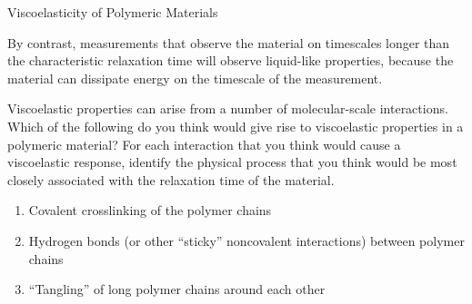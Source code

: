 \begin{activity}{Viscoelasticity of Polymeric Materials}
\begin{ctqs}
\begin{enumerate}
\begin{solution}[2.5in]
						By contrast, measurements that observe the material on timescales longer than the characteristic relaxation time will observe liquid-like properties, because the material can dissipate energy on the timescale of the measurement.
					
					\end{solution}
			\end{enumerate}
		
\end{ctqs}
	

\begin{exercises}

		\exercise Viscoelastic properties can arise from a number of molecular-scale interactions.  Which of the following do you think would give rise to viscoelastic properties in a polymeric material?  For each interaction that you think would cause a viscoelastic response, identify the physical process that you think would be most closely associated with the relaxation time of the material.
		
			\begin{enumerate}
				\item Covalent crosslinking of the polymer chains
				
					\begin{solution}\end{solution}
					
				\item Hydrogen bonds (or other ``sticky'' noncovalent interactions) between polymer chains
				
					\begin{solution}\end{solution}
					
				\item ``Tangling'' of long polymer chains around each other
				
					\begin{solution}
\end{solution}
\end{enumerate}
\end{exercises}
\end{activity}
